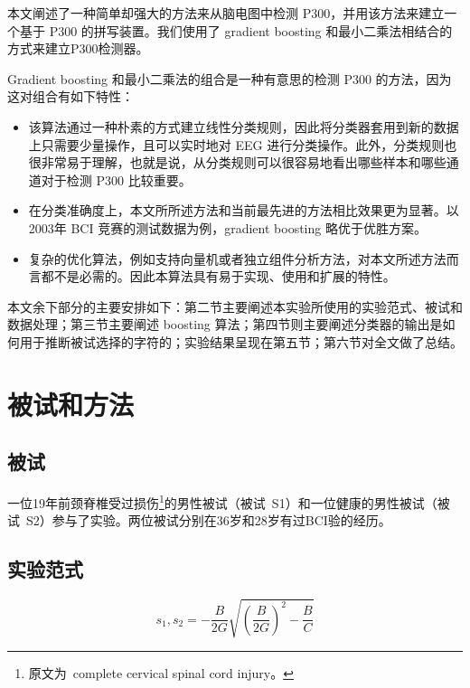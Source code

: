 \documentclass[a4paper]{ecust_translation}
\begin{document}
  本文阐述了一种简单却强大的方法来从脑电图中检测 P300，并用该方法来建立一个基于 P300 的拼写装置。我们使用了 gradient boosting 和最小二乘法相结合的方式来建立P300检测器。

  Gradient boosting 和最小二乘法的组合是一种有意思的检测 P300 的方法，因为这对组合有如下特性：

  \begin{itemize}
    \item 该算法通过一种朴素的方式建立线性分类规则，因此将分类器套用到新的数据上只需要少量操作，且可以实时地对 EEG 进行分类操作。此外，分类规则也很非常易于理解，也就是说，从分类规则可以很容易地看出哪些样本和哪些通道对于检测 P300 比较重要。
    \item 在分类准确度上，本文所所述方法和当前最先进的方法相比效果更为显著。以2003年 BCI 竞赛的测试数据为例，gradient boosting 略优于优胜方案。
    \item 复杂的优化算法，例如支持向量机或者独立组件分析方法，对本文所述方法而言都不是必需的。因此本算法具有易于实现、使用和扩展的特性。
  \end{itemize}

  本文余下部分的主要安排如下：第二节主要阐述本实验所使用的实验范式、被试和数据处理；第三节主要阐述 boosting 算法；第四节则主要阐述分类器的输出是如何用于推断被试选择的字符的；实验结果呈现在第五节；第六节对全文做了总结。
  \section{被试和方法}
  \subsection{被试}
  一位19年前颈脊椎受过损伤\footnote{原文为~complete cervical spinal cord injury。}的男性被试（被试~S1）和一位健康的男性被试（被试~S2）参与了实验。两位被试分别在36岁和28岁有过BCI验的经历。
  \subsection{实验范式}

  \begin{equation}
  s_1, s_2= - \frac{B}{2G} \sqrt{(\frac{B}{2G})^2 - \frac{B}{C}}
  \end{equation}
\end{document}
